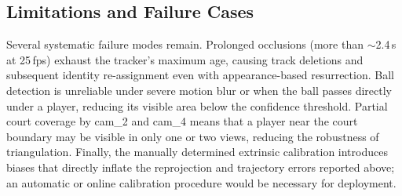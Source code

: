 \subsection{Limitations and Failure Cases}

Several systematic failure modes remain.
Prolonged occlusions (more than $\sim$2.4\,s at 25\,fps) exhaust the tracker's
maximum age, causing track deletions and subsequent identity re-assignment even with
appearance-based resurrection.
Ball detection is unreliable under severe motion blur or when the ball passes
directly under a player, reducing its visible area below the confidence threshold.
Partial court coverage by cam\_2 and cam\_4 means that a player near the court
boundary may be visible in only one or two views, reducing the robustness of
triangulation.
Finally, the manually determined extrinsic calibration introduces biases that
directly inflate the reprojection and trajectory errors reported above; an automatic
or online calibration procedure would be necessary for deployment.
